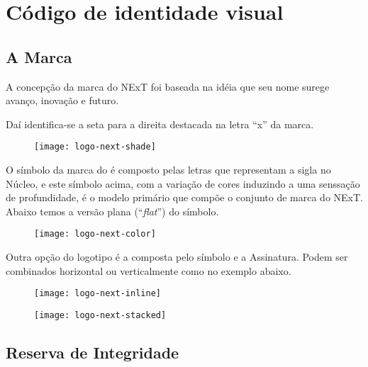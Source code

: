 \documentclass{manualmarca}
\begin{document}
\chapter{Código de identidade visual}
\label{cha:codigo-de-identidade}

\section{A Marca}
\label{sec:marca}

A concepção da marca do NExT foi baseada na idéia que seu nome surege avanço,
inovação e futuro.

Daí identifica-se a seta para a direita destacada na letra ``x'' da marca.

\begin{figure}[!htp]
  \centering
  \texttt{[image: logo-next-shade]}
\end{figure}

O símbolo da marca do \NExT{} é composto pelas letras que representam a sigla no Núcleo, e este símbolo acima, com a variação de cores induzindo a uma senssação de profundidade, é o modelo primário que compõe o conjunto de marca do NExT. Abaixo temos a versão plana (``\emph{flat}'') do símbolo.

\begin{figure}[!htp]
  \centering
  \texttt{[image: logo-next-color]}
\end{figure}

Outra opção do logotipo é a composta pelo símbolo e a Assinatura. Podem ser combinados horizontal ou verticalmente como no exemplo abaixo.

\begin{figure}[!htp]
  \centering
  \texttt{[image: logo-next-inline]}
\end{figure}

\begin{figure}[!htp]
  \centering
  \texttt{[image: logo-next-stacked]}
\end{figure}

\pagebreak[4]
\section{Reserva de Integridade}
\label{sec:area-de-nao}
\end{document}
